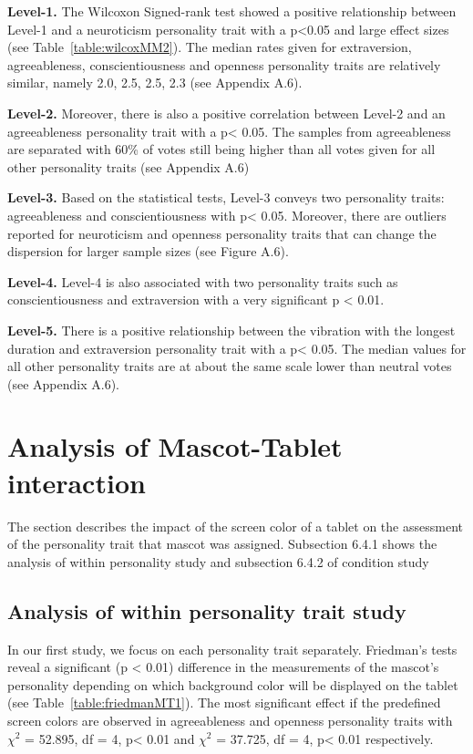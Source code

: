 \par \textbf{Level-1.} The Wilcoxon Signed-rank test showed a positive relationship between Level-1 and a
neuroticism personality trait with a p<0.05 and large effect sizes (see Table~\ref{table:wilcoxMM2}). The median
rates given for extraversion, agreeableness, conscientiousness and openness personality traits are relatively similar,
namely 2.0, 2.5, 2.5, 2.3 (see Appendix A.6).
\par \textbf{Level-2.} Moreover, there is also a positive correlation between Level-2 and an agreeableness personality
trait with a p< 0.05. The samples from agreeableness are separated with 60\% of votes still being higher than all
votes given for all other personality traits (see Appendix A.6)
\par \textbf{Level-3.} Based on the statistical tests, Level-3 conveys two personality traits: agreeableness and
conscientiousness with p< 0.05. Moreover, there are outliers reported for neuroticism and openness personality traits
that can change the dispersion for larger sample sizes (see Figure A.6).
\par \textbf{Level-4.} Level-4 is also associated with two personality traits such as conscientiousness and extraversion
with a very significant p < 0.01.
\par \textbf{Level-5.} There is a positive relationship between the vibration with the longest duration and extraversion
personality trait with a p< 0.05. The median values for all other personality traits are at about the same scale
lower than neutral votes (see Appendix A.6).

\section{Analysis of Mascot-Tablet interaction}
\label{M-T}
The section describes the impact of the screen color of a tablet on the assessment of the personality trait that
mascot was assigned. Subsection 6.4.1 shows the analysis of within personality study and subsection 6.4.2 of condition study

\subsection{Analysis of within personality trait study}
\label{Study1(M-T)}
In our first study, we focus on each personality trait separately. Friedman’s tests reveal a significant (p < 0.01)
difference in the measurements of the mascot’s personality depending on which background color will be displayed
on the tablet (see Table~\ref{table:friedmanMT1}). The most significant effect if the predefined screen colors are
observed in agreeableness and openness personality traits with $\chi^2$ = 52.895, df = 4, p< 0.01 and $\chi^2$ = 37.725,
df = 4, p< 0.01 respectively.

